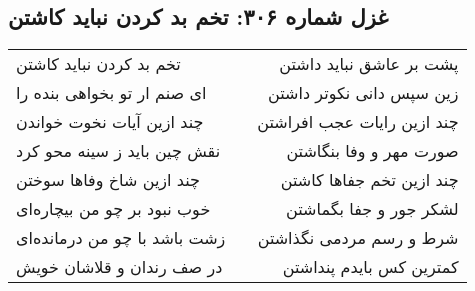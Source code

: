 \begin{center}
\section*{غزل شماره ۳۰۶: تخم بد کردن نباید کاشتن}
\label{sec:306}
\begin{longtable}{l p{0.5cm} r}
تخم بد کردن نباید کاشتن
&&
پشت بر عاشق نباید داشتن
\\
ای صنم ار تو بخواهی بنده را
&&
زین سپس دانی نکوتر داشتن
\\
چند ازین آیات نخوت خواندن
&&
چند ازین رایات عجب افراشتن
\\
نقش چین باید ز سینه محو کرد
&&
صورت مهر و وفا بنگاشتن
\\
چند ازین شاخ وفاها سوختن
&&
چند ازین تخم جفاها کاشتن
\\
خوب نبود بر چو من بیچاره‌ای
&&
لشکر جور و جفا بگماشتن
\\
زشت باشد با چو من درمانده‌ای
&&
شرط و رسم مردمی نگذاشتن
\\
در صف رندان و قلاشان خویش
&&
کمترین کس بایدم پنداشتن
\\
\end{longtable}
\end{center}

